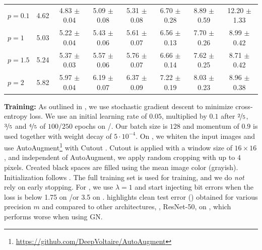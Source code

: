 \begin{table}[t]
\begin{tabular}{|l | c | c | c | c | c | c | c |}
		\Random[$0.1$] $p{=}0.1$ & 4.62 & 4.83 {\color{gray}\scriptsize ${\pm}$0.04} & 5.09 {\color{gray}\scriptsize ${\pm}$0.08} & 5.31 {\color{gray}\scriptsize ${\pm}$0.08} & 6.70 {\color{gray}\scriptsize ${\pm}$0.28} & 8.89 {\color{gray}\scriptsize ${\pm}$0.59} & 12.20 {\color{gray}\scriptsize ${\pm}$1.33}\\
		\Random[$0.1$] $p{=}1$ & 5.03 & 5.22 {\color{gray}\scriptsize ${\pm}$0.04} & 5.43 {\color{gray}\scriptsize ${\pm}$0.06} & 5.61 {\color{gray}\scriptsize ${\pm}$0.07} & 6.56 {\color{gray}\scriptsize ${\pm}$0.13} & 7.70 {\color{gray}\scriptsize ${\pm}$0.26} & 8.99 {\color{gray}\scriptsize ${\pm}$0.42}\\
		\Random[$0.1$] $p{=}1.5$ & 5.24 & 5.37 {\color{gray}\scriptsize ${\pm}$0.03} & 5.57 {\color{gray}\scriptsize ${\pm}$0.06} & 5.76 {\color{gray}\scriptsize ${\pm}$0.07} & 6.66 {\color{gray}\scriptsize ${\pm}$0.14} & 7.62 {\color{gray}\scriptsize ${\pm}$0.25} & 8.71 {\color{gray}\scriptsize ${\pm}$0.42}\\
		\Random[$0.1$] $p{=}2$ & 5.82 & 5.97 {\color{gray}\scriptsize ${\pm}$0.04} & 6.19 {\color{gray}\scriptsize ${\pm}$0.07} & 6.37 {\color{gray}\scriptsize ${\pm}$0.09} & 7.22 {\color{gray}\scriptsize ${\pm}$0.19} & 8.03 {\color{gray}\scriptsize ${\pm}$0.23} & 8.96 {\color{gray}\scriptsize ${\pm}$0.38}\\
		\hline
	\end{tabular}
	\vspace*{-0.1cm}
\end{table}

\textbf{Training:} As outlined in , we use stochastic gradient descent to minimize cross-entropy loss. We use an initial learning rate of $0.05$, multiplied by $0.1$ after $\nicefrac{2}{5}$, $\nicefrac{3}{5}$ and $\nicefrac{4}{5}$ of $100$/$250$ epochs on \MNIST/\Cifar. Our batch size is $128$ and momentum of $0.9$ is used together with weight decay of $5\cdot10^{-4}$. On \Cifar, we whiten the input images and use AutoAugment\footnote{\url{https://github.com/DeepVoltaire/AutoAugment}} \cite{CubukARXIV2018} with Cutout \cite{DevriesARXIV2017}. Cutout is applied with a window size of $16 \times 16$, and independent of AutoAugment, we apply random cropping with up to $4$ pixels. Created black spaces are filled using the mean image color (grayish). Initialization follows \cite{HeICCV2015}. The full training set is used for training, and we do \emph{not} rely on early stopping. For \Random, we use $\lambda = 1$ and start injecting bit errors when the loss is below 1.75 on \MNIST/\CifarT or 3.5 on \CifarH.  highlights clean test error (\TE) obtained for various precision $m$ and compared to other architectures, \eg, ResNet-50, on \CifarT, which performs worse when using GN.

